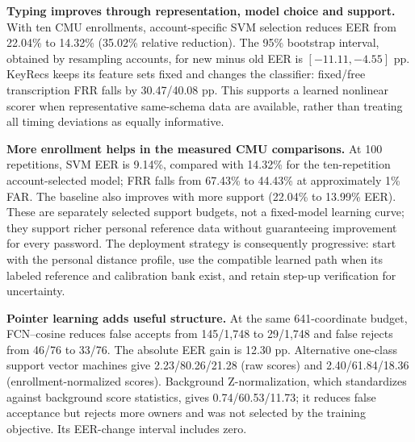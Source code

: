 \documentclass[10pt,a4paper]{article}
\begin{document}
\begin{center}
\end{center}

\textbf{Typing improves through representation, model choice and support.} With ten CMU enrollments, account-specific SVM selection reduces EER from 22.04\% to 14.32\% (35.02\% relative reduction). The 95\% bootstrap interval, obtained by resampling accounts, for new minus old EER is $[-11.11,-4.55]$ pp. KeyRecs keeps its feature sets fixed and changes the classifier: fixed/free transcription FRR falls by 30.47/40.08 pp. This supports a learned nonlinear scorer when representative same-schema data are available, rather than treating all timing deviations as equally informative.

\textbf{More enrollment helps in the measured CMU comparisons.} At 100 repetitions, SVM EER is 9.14\%, compared with 14.32\% for the ten-repetition account-selected model; FRR falls from 67.43\% to 44.43\% at approximately 1\% FAR. The baseline also improves with more support (22.04\% to 13.99\% EER). These are separately selected support budgets, not a fixed-model learning curve; they support richer personal reference data without guaranteeing improvement for every password. The deployment strategy is consequently progressive: start with the personal distance profile, use the compatible learned path when its labeled reference and calibration bank exist, and retain step-up verification for uncertainty.

\textbf{Pointer learning adds useful structure.} At the same 641-coordinate budget, FCN--cosine reduces false accepts from 145/1,748 to 29/1,748 and false rejects from 46/76 to 33/76. The absolute EER gain is 12.30 pp. Alternative one-class support vector machines give 2.23/80.26/21.28 (raw scores) and 2.40/61.84/18.36 (enrollment-normalized scores). Background Z-normalization, which standardizes against background score statistics, gives 0.74/60.53/11.73; it reduces false acceptance but rejects more owners and was not selected by the training objective. Its EER-change interval includes zero.
\end{document}
